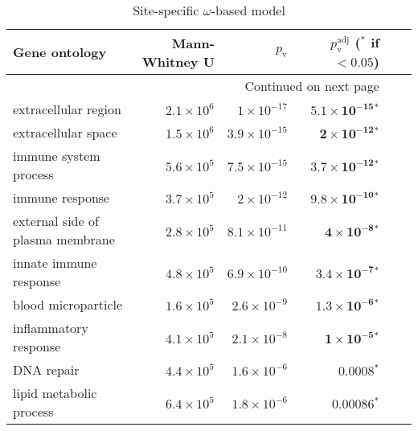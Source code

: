 \begin{longtable}{|l|r|r|r|r|r|}
    \caption{Site-specific $\omega$-based model} \\
    \toprule
    Gene ontology                                       & Mann-Whitney U     & $p_{\mathrm{v}}$     & $p_{\mathrm{v}}^{\mathrm{adj}}$ ($\bm{^*}$ if $ < 0.05$) \\
    \midrule
    \endhead
    \midrule
    \multicolumn{4}{r}{{Continued on next page}} \\
    \midrule
    \endfoot

    \bottomrule
    \endlastfoot
    extracellular region                                & $2.1\times 10^{6}$ & $ 1\times 10^{-17}$  & $\bm{5.1\times 10^{-15}{^*}}$                            \\
    extracellular space                                 & $1.5\times 10^{6}$ & $3.9\times 10^{-15}$ & $\bm{ 2\times 10^{-12}{^*}}$                             \\
    immune system process                               & $5.6\times 10^{5}$ & $7.5\times 10^{-15}$ & $\bm{3.7\times 10^{-12}{^*}}$                            \\
    immune response                                     & $3.7\times 10^{5}$ & $ 2\times 10^{-12}$  & $\bm{9.8\times 10^{-10}{^*}}$                            \\
    external side of plasma membrane                    & $2.8\times 10^{5}$ & $8.1\times 10^{-11}$ & $\bm{ 4\times 10^{-8}{^*}}$                              \\
    innate immune response                              & $4.8\times 10^{5}$ & $6.9\times 10^{-10}$ & $\bm{3.4\times 10^{-7}{^*}}$                             \\
    blood microparticle                                 & $1.6\times 10^{5}$ & $2.6\times 10^{-9}$  & $\bm{1.3\times 10^{-6}{^*}}$                             \\
    inflammatory response                               & $4.1\times 10^{5}$ & $2.1\times 10^{-8}$  & $\bm{ 1\times 10^{-5}{^*}}$                              \\
    DNA repair                                          & $4.4\times 10^{5}$ & $1.6\times 10^{-6}$  & $\bm{0.0008{^*}}$                                        \\
    lipid metabolic process                             & $6.4\times 10^{5}$ & $1.8\times 10^{-6}$  & $\bm{0.00086{^*}}$                                       \\

\end{longtable}
